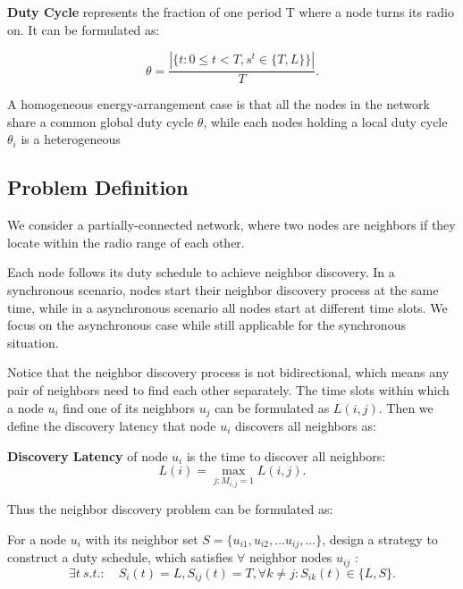 \begin{definition}
\textbf{Duty Cycle} represents the fraction of one period T where a node turns its radio on. It can be formulated as:

$$\theta=\frac{|\{t: 0\leq t<T, s^t \in \{T,L\}\}|}{T}.
$$
  
\end{definition}

A homogeneous energy-arrangement case is that all the nodes
in the network share a common global duty cycle $\theta$,
while each nodes holding a local duty cycle $\theta_i$ is 
a heterogeneous


\subsection{Problem Definition}

We consider a partially-connected network, 
where two nodes are neighbors if they locate within the radio range of each other. 


Each node follows its duty schedule to achieve neighbor discovery. In a synchronous scenario,
nodes start their neighbor discovery process at the same time, while in a asynchronous  scenario
all nodes start at different time slots. We focus on the asynchronous case while still applicable for the
synchronous situation.

 
Notice that the neighbor discovery process is not bidirectional, which means any pair of neighbors 
need to find each other separately. The time slots within which a node $u_i$ find one of its neighbors $u_j$ can be formulated 
as $L(i,j)$. Then we define the discovery latency that node $u_i$ discovers all neighbors as:
\begin{definition}
\textbf{Discovery Latency} of node $u_i$ is the time to discover all neighbors:
$$L(i) = \max_{j:M_{i,j}=1} L(i,j).
$$
\end{definition}

Thus the neighbor discovery problem can be formulated as:
\begin{problem}
For a node $u_i$ with its neighbor set $S = \{u_{i1},u_{i2},...u_{ij},...\}$, 
design a strategy to construct a duty schedule, which satisfies
$\forall$ neighbor nodes $u_{ij}$ :
$$
\exists t \ s.t. :  \quad
S_i(t) = L ,
S_{ij}(t) = T,
\forall k \neq j : S_{ik}(t) \in \{L, S\}.
$$

\end{problem}


